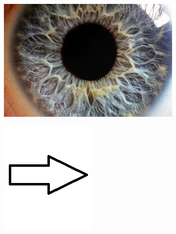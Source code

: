 \documentclass{article}
\begin{document}
\begin{figure}[H]
\begin{subfigure}{.47\textwidth}
  \centering
  \includegraphics[width=0.97\linewidth]{_Figures/raw_data_4.jpg}
  \caption{}
  \label{fig:raw_4}
\end{subfigure}%
\begin{subfigure}{.09\textwidth}
  \centering
  \includegraphics[width=0.97\linewidth]{_Figures/leftrightarrow.jpg}
  \label{fig:arrow}

\end{subfigure}
\end{figure}
\end{document}
